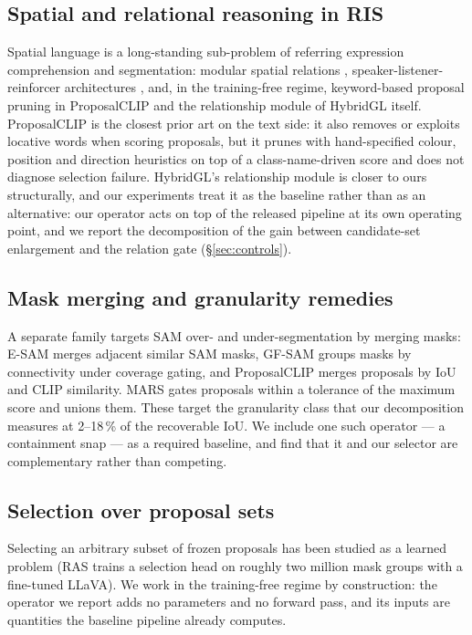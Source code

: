 \subsection{Spatial and relational reasoning in RIS}

Spatial language is a long-standing sub-problem of referring expression
comprehension and segmentation: modular spatial relations
\cite{hu2016natural}, speaker-listener-reinforcer architectures
\cite{yu2017slr}, and, in the training-free regime, keyword-based proposal
pruning in ProposalCLIP \cite{zhou2022proposalclip} and the relationship
module of HybridGL itself. ProposalCLIP is the closest prior art on the text
side: it also removes or exploits locative words when scoring proposals, but it
prunes with hand-specified colour, position and direction heuristics on top of
a class-name-driven score and does not diagnose selection failure. HybridGL's
relationship module is closer to ours structurally, and our experiments treat
it as the baseline rather than as an alternative: our operator acts on top of
the released pipeline at its own operating point, and we report the
decomposition of the gain between candidate-set enlargement and the relation
gate (§\ref{sec:controls}).

\subsection{Mask merging and granularity remedies}

A separate family targets SAM over- and under-segmentation by merging masks:
E-SAM \cite{esam2025} merges adjacent similar SAM masks, GF-SAM
\cite{gfsam2024} groups masks by connectivity under coverage gating, and
ProposalCLIP merges proposals by IoU and CLIP similarity. MARS
\cite{mars2026} gates proposals within a tolerance of the maximum score and
unions them. These target the granularity class that our decomposition measures
at 2--18\,\% of the recoverable IoU. We include one such operator --- a
containment snap --- as a required baseline, and find that it and our selector
are complementary rather than competing.

\subsection{Selection over proposal sets}

Selecting an arbitrary subset of frozen proposals has been studied as a learned
problem (RAS \cite{ras2025} trains a selection head on roughly two million mask
groups with a fine-tuned LLaVA). We work in the training-free regime by
construction: the operator we report adds no parameters and no forward pass,
and its inputs are quantities the baseline pipeline already computes.
